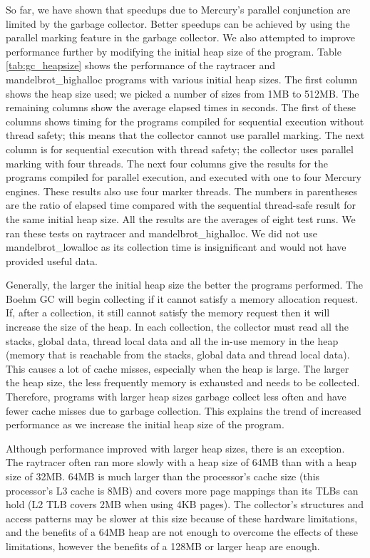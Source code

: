 So far,
we have shown that speedups due to Mercury's parallel conjunction
are limited by the garbage collector.
Better speedups can be achieved by using the parallel marking feature in the
garbage collector.
We also attempted to improve performance further by modifying the initial
heap size of the program.
Table \ref{tab:gc_heapsize} shows the performance of the raytracer and
mandelbrot\_highalloc programs with various initial heap sizes.
The first column shows the heap size used;
we picked a number of sizes from 1MB to 512MB.
The remaining columns show the average elapsed times in seconds.
The first of these columns shows timing for the programs compiled for
sequential execution without thread safety;
this means that the collector cannot use parallel marking.
The next column is for sequential execution with thread safety;
the collector uses parallel marking with four threads.
The next four columns give the results for the programs compiled for
parallel execution, and executed with one to four Mercury engines.
These results also use four marker threads.
The numbers in parentheses are the ratio of elapsed time compared with the
sequential thread-safe result for the same initial heap size.
All the results are the averages of eight test runs.
We ran these tests on raytracer and mandelbrot\_highalloc.
We did not use mandelbrot\_lowalloc as its collection time is insignificant
and would not have provided useful data.

Generally, the larger the initial heap size the better the programs
performed.
The Boehm GC will begin collecting if it cannot satisfy a memory allocation
request.
If, after a collection, it still cannot satisfy the memory request then it
will increase the size of the heap.
In each collection,
the collector must read all the stacks, global data, thread local data and
all the in-use memory in the heap 
(memory that is reachable from the stacks, global data and thread local
data).
This causes a lot of cache misses, especially when the heap is large.
The larger the heap size,
the less frequently memory is exhausted and needs to be collected.
Therefore,
programs with larger heap sizes garbage collect less often and
have fewer cache misses due to garbage collection.
This explains the trend of increased performance as we increase the initial
heap size of the program.

Although performance improved with larger heap sizes,
there is an exception.
The raytracer often ran more slowly with a heap size of 64MB
than with a heap size of 32MB.
64MB is much larger than the processor's cache size
(this processor's L3 cache is 8MB) and
covers more page mappings than its TLBs can hold (L2 TLB covers 2MB when
using 4KB pages).
The collector's structures and access patterns may be slower at this size
because of these hardware limitations,
and the benefits of a 64MB heap are not enough to overcome the effects of
these limitations,
however the benefits of a 128MB or larger heap are enough.

